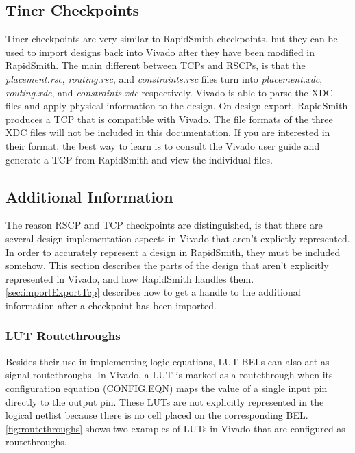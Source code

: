 \documentclass[10pt]{article}
\begin{document}
\subsection{Tincr Checkpoints} \label{sec:tcp}
Tincr checkpoints are very similar to RapidSmith checkpoints, but they can be
used to import designs back into Vivado after they have been modified in
RapidSmith. The main different between TCPs and RSCPs, is that the
\textit{placement.rsc}, \textit{routing.rsc}, and \textit{constraints.rsc} files
turn into \textit{placement.xdc}, \textit{routing.xdc}, and \textit{constraints.xdc}
respectively. Vivado is able to parse the XDC files and apply physical
information to the design. On design export, RapidSmith produces
a TCP that is compatible with Vivado. The file formats of the three XDC files
will not be included in this documentation. If you are interested in their
format, the best way to learn is to consult the Vivado user guide and generate a
TCP from RapidSmith and view the individual files.

\subsection{Additional Information} \label{sec:additionalInfo}
The reason RSCP and TCP checkpoints are distinguished, is that there are
several design implementation aspects in Vivado that aren't explictly
represented. In order to accurately represent a design in RapidSmith, they
must be included somehow. This section describes the parts of the design that
aren't explicitly represented in Vivado, and how RapidSmith handles them.
\autoref{sec:importExportTcp} describes how to get a handle to the additional
information after a checkpoint has been imported.

\subsubsection{LUT Routethroughs}
Besides their use in implementing logic equations, LUT BELs can also act as
signal routethroughs. In Vivado, a LUT is marked as a  routethrough when its
configuration equation (CONFIG.EQN) maps the value of a single input pin
directly to the output pin. These LUTs are not explicitly represented in the
logical netlist because there is no cell placed on the corresponding BEL. 
\autoref{fig:routethroughs} shows two examples of LUTs in Vivado that are
configured as routethroughs.
\end{document}
